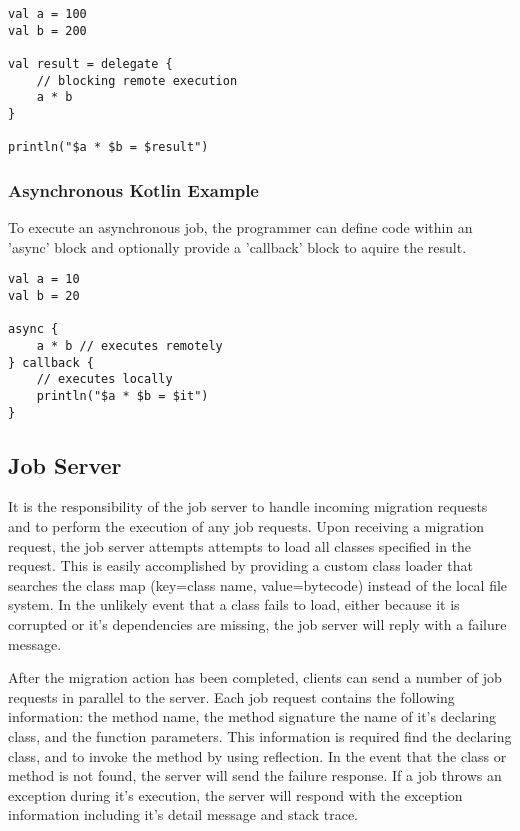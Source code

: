 \begin{lstlisting}
val a = 100
val b = 200

val result = delegate {
    // blocking remote execution
    a * b
}

println("$a * $b = $result")
\end{lstlisting}

\subsubsection{Asynchronous Kotlin Example}

To execute an asynchronous job, the programmer can define code within an
'async' block and optionally provide a 'callback' block to aquire the result.

\begin{lstlisting}
val a = 10
val b = 20

async {
    a * b // executes remotely
} callback {
    // executes locally
    println("$a * $b = $it")
}
\end{lstlisting}

\subsection{Job Server}\label{subsec:jobServer}

It is the responsibility of the job server to handle incoming
migration requests and to perform the execution of any job requests.
Upon receiving a migration request, the job server attempts attempts to
load all classes specified in the request.
This is easily accomplished by providing a custom class loader
that searches the class map (key=class name, value=bytecode) instead
of the local file system.
In the unlikely event that a class fails to load, either because it is corrupted or
it's dependencies are missing, the job server will reply with a failure message.

After the migration action has been completed, clients can send a number of job requests
in parallel to the server.
Each job request contains the following information: the method name, the method signature
the name of it's declaring class, and the function parameters.
This information is required find the declaring class, and to invoke the method
by using reflection.
In the event that the class or method is not found, the server will send the failure
response.
If a job throws an exception during it's execution, the server will respond with
the exception information including it's detail message and stack trace.

